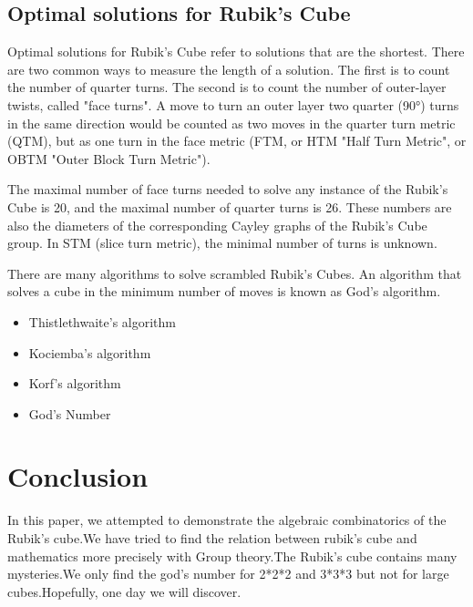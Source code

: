 \documentclass{article}
\begin{document}
\subsection{Optimal solutions for Rubik's Cube}
Optimal solutions for Rubik's Cube refer to solutions that are the shortest. There are two common ways to measure the length of a solution. The first is to count the number of quarter turns. The second is to count the number of outer-layer twists, called "face turns". A move to turn an outer layer two quarter (90°) turns in the same direction would be counted as two moves in the quarter turn metric (QTM), but as one turn in the face metric (FTM, or HTM "Half Turn Metric", or OBTM "Outer Block Turn Metric").\cite{rokicki2010god}

The maximal number of face turns needed to solve any instance of the Rubik's Cube is 20,\cite{rokicki2010god} and the maximal number of quarter turns is 26.\cite{rokicki2010god} These numbers are also the diameters of the corresponding Cayley graphs of the Rubik's Cube group. In STM (slice turn metric), the minimal number of turns is unknown.

There are many algorithms to solve scrambled Rubik's Cubes. An algorithm that solves a cube in the minimum number of moves is known as God's algorithm.
\begin{itemize}
    \item Thistlethwaite's algorithm
    \item Kociemba's algorithm
    \item Korf's algorithm
    \item God's Number
\end{itemize}

\section{Conclusion}
In this paper, we attempted to demonstrate the algebraic combinatorics of the Rubik's cube.We have tried to find the relation between rubik's cube and mathematics more precisely with Group theory.The Rubik's cube contains many mysteries.We only find the god's number for 2*2*2 and 3*3*3 but not for large cubes.Hopefully, one day we will discover.









\end{document}
